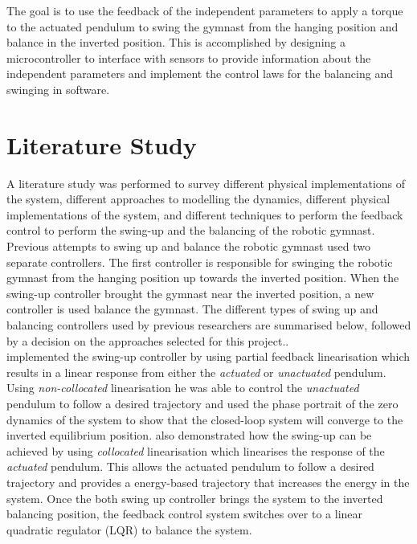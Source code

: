 The goal is to use the feedback of the independent parameters to apply a torque to the actuated pendulum to swing the gymnast from the hanging position and balance in the inverted position. This is accomplished by designing a microcontroller to interface with sensors to provide information about the independent parameters and implement the control laws for the balancing and swinging in software.\\


\section{Literature Study}
\label{sec:literature_study}

A literature study was performed to survey different physical implementations of the system, different approaches to modelling the dynamics, different physical implementations of the system, and different techniques to perform the feedback control to perform the swing-up and the balancing of the robotic gymnast.\\

Previous attempts to swing up and balance the robotic gymnast used two separate controllers. The first controller is responsible for swinging the robotic gymnast from the hanging position up towards the inverted position. When the swing-up controller brought the gymnast near the inverted position, a new controller is used balance the gymnast. The different types of swing up and balancing controllers used by previous researchers are summarised below, followed by a decision on the approaches selected for this project..\\

\citet{spong_swingup} implemented the swing-up controller by using partial feedback linearisation which results in a linear response from either the \textit{actuated} or \textit{unactuated} pendulum. Using \textit{non-collocated} linearisation he was able to control the \textit{unactuated} pendulum to follow a desired trajectory and used the phase portrait of the zero dynamics of the system to show that the closed-loop system will converge to the inverted equilibrium position. \citeauthor{spong_swingup} also demonstrated how the swing-up can be achieved by using \textit{collocated} linearisation which linearises the response of the \textit{actuated} pendulum. This allows the actuated pendulum to follow a desired trajectory and \citeauthor{spong_swingup} provides a energy-based trajectory that increases the energy in the system. Once the both swing up controller brings the system to the inverted balancing position, the feedback control system switches over to a linear quadratic regulator (LQR) to balance the system.\\

